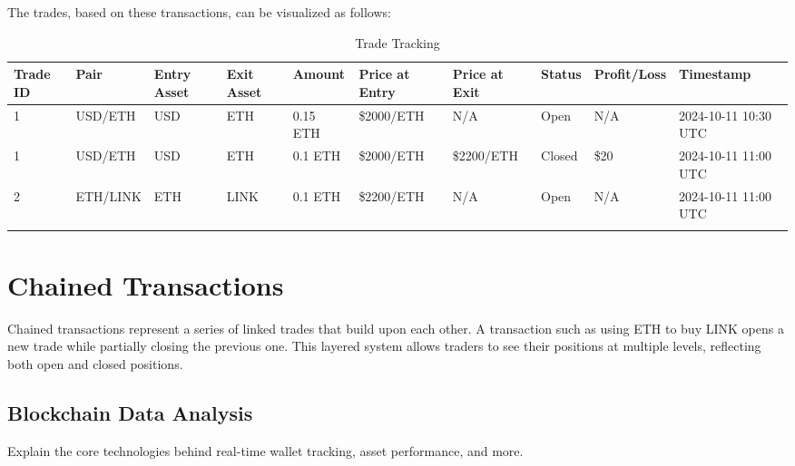 \documentclass{article}
\begin{document}
The trades, based on these transactions, can be visualized as follows:

\scriptsize %
\begin{longtable}{|p{1cm}|p{1.2cm}|p{1.2cm}|p{1.2cm}|p{1.2cm}|p{1.5cm}|p{1.5cm}|p{1.2cm}|p{1.2cm}|p{1.5cm}|}
\hline
\textbf{Trade ID} & \textbf{Pair} & \textbf{Entry Asset} & \textbf{Exit Asset} & \textbf{Amount} & \textbf{Price at Entry} & \textbf{Price at Exit} & \textbf{Status} & \textbf{Profit/Loss} & \textbf{Timestamp} \\
\hline
1 & USD/ETH & USD & ETH & 0.15 ETH & \$2000/ETH & N/A & Open & N/A & 2024-10-11 10:30 UTC \\
\hline
1 & USD/ETH & USD & ETH & 0.1 ETH & \$2000/ETH & \$2200/ETH & Closed & \$20 & 2024-10-11 11:00 UTC \\
\hline
2 & ETH/LINK & ETH & LINK & 0.1 ETH & \$2200/ETH & N/A & Open & N/A & 2024-10-11 11:00 UTC \\
\hline
\caption{Trade Tracking}
\end{longtable}
\normalsize %

\section{Chained Transactions}
Chained transactions represent a series of linked trades that build upon each other. A transaction such as using ETH to buy LINK opens a new trade while partially closing the previous one. This layered system allows traders to see their positions at multiple levels, reflecting both open and closed positions.

\subsection{Blockchain Data Analysis}
Explain the core technologies behind real-time wallet tracking, asset performance, and more.
\end{document}
